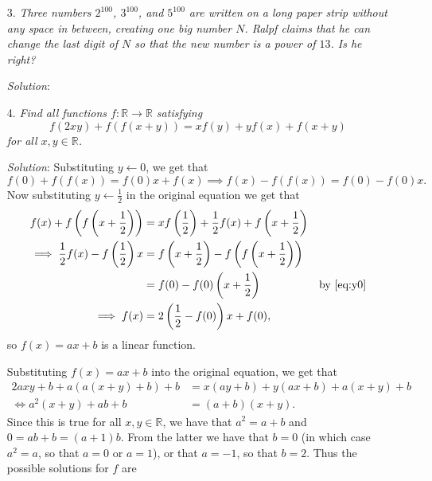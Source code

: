 \documentclass{article}
\begin{document}
\begin{enumerate}
\item[3.] %
\textit{Three numbers $2^{100}$, $3^{100}$, and $5^{100}$ are written on a long paper strip without any space in between, creating one big number $N$.
Ralpf claims that he can change the last digit of $N$ so that the new number is a power of $13$.
Is he right?}

\textit{Solution}:


\item[4.] %
\textit{Find all functions $f: \mathbb{R} \to \mathbb{R}$ satisfying
\[ f(2xy) +f(f(x+y)) = xf(y) + yf(x) +f(x+y) \]
for all $x,y \in \mathbb{R}$.}

\textit{Solution}:
Substituting $y \leftarrow 0$, we get that
\begin{equation} \label{eq:y0}
  f(0) +f(f(x)) = f(0)x +f(x) \implies f(x) -f(f(x)) = f(0) -f(0)x.
\end{equation}
Now substituting $y \leftarrow \frac{1}{2}$ in the original equation we get that
\begin{align*}
  f(x) +f\left(f\left(x+\frac{1}{2}\right)\right) &= x f\left(\frac{1}{2}\right) +\frac{1}{2} f(x) +f\left(x+\frac{1}{2}\right) \\
  \implies \frac{1}{2} f(x) -f\left(\frac{1}{2}\right) x &= f\left(x+\frac{1}{2}\right) -f\left(f\left(x+\frac{1}{2}\right)\right) \\
  &= f(0) -f(0) \left(x+\frac{1}{2}\right) & \text{by \eqref{eq:y0}} \\
  \implies f(x) &= 2\left(\frac{1}{2}-f(0)\right) x +f(0),
\end{align*}
so $f(x) = ax+b$ is a linear function.

Substituting $f(x) = ax+b$ into the original equation, we get that
\begin{align*}
  2a x y +b +a(a(x+y)+b) +b &= x(a y + b) +y(a x + b) +a(x+y) +b \\
  \iff a^2(x+y) + a b + b &= (a+b)(x+y).
\end{align*}
Since this is true for all $x, y \in \mathbb{R}$, we have that $a^2 = a+b$ and $0 = ab+b = (a+1)b$.
From the latter we have that $b = 0$ (in which case $a^2 = a$, so that $a = 0$ or $a = 1$), or that $a = -1$, so that $b = 2$.
Thus the possible solutions for $f$ are



\end{enumerate}
\end{document}
